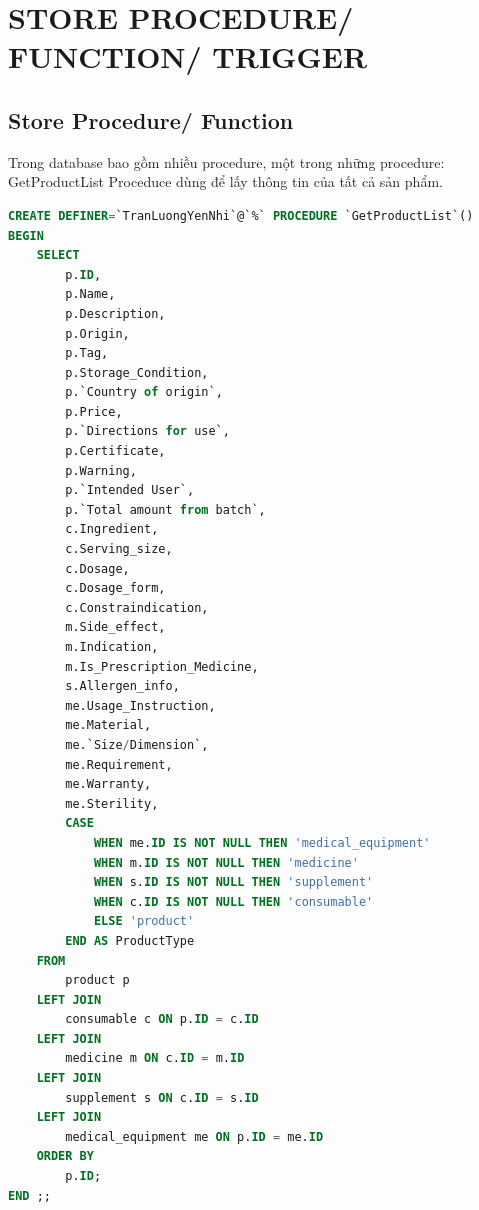 



\section{STORE PROCEDURE/ FUNCTION/ TRIGGER}
\subsection{Store Procedure/ Function}
Trong database bao gồm nhiều procedure, một trong những procedure:\\
GetProductList Proceduce dùng để lấy thông tin của tất cả sản phẩm.

\begin{lstlisting}[language=SQL, caption=GetProductList Procedure] 
CREATE DEFINER=`TranLuongYenNhi`@`%` PROCEDURE `GetProductList`()
BEGIN
    SELECT
        p.ID,
        p.Name,
        p.Description,
        p.Origin,
        p.Tag,
        p.Storage_Condition,
        p.`Country of origin`,
        p.Price,
        p.`Directions for use`,
        p.Certificate,
        p.Warning,
        p.`Intended User`,
        p.`Total amount from batch`,
        c.Ingredient,
        c.Serving_size,
        c.Dosage,
        c.Dosage_form,
        c.Constraindication,
        m.Side_effect,
        m.Indication,
        m.Is_Prescription_Medicine,
        s.Allergen_info,
        me.Usage_Instruction,
        me.Material,
        me.`Size/Dimension`,
        me.Requirement,
        me.Warranty,
        me.Sterility,
        CASE
            WHEN me.ID IS NOT NULL THEN 'medical_equipment'
            WHEN m.ID IS NOT NULL THEN 'medicine'
            WHEN s.ID IS NOT NULL THEN 'supplement'
            WHEN c.ID IS NOT NULL THEN 'consumable'
            ELSE 'product'  
        END AS ProductType
    FROM
        product p
    LEFT JOIN
        consumable c ON p.ID = c.ID
    LEFT JOIN
        medicine m ON c.ID = m.ID
    LEFT JOIN
        supplement s ON c.ID = s.ID
    LEFT JOIN
        medical_equipment me ON p.ID = me.ID
    ORDER BY
        p.ID;
END ;;

\end{lstlisting}

